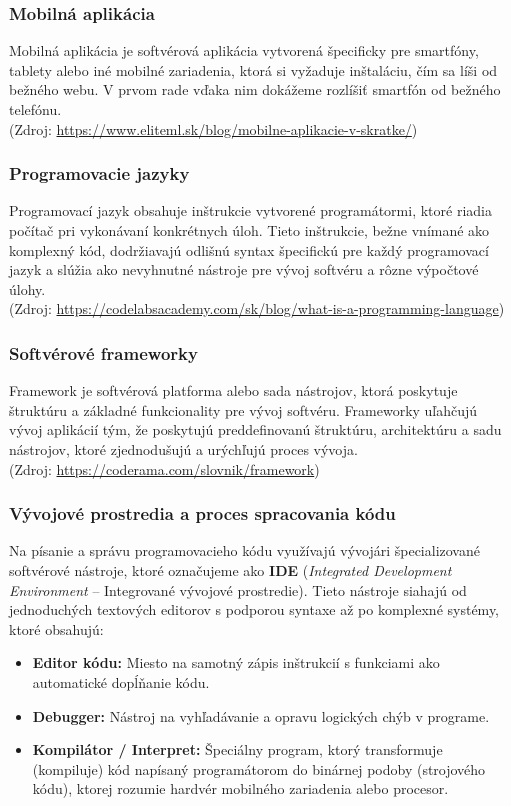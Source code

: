 \subsubsection{Mobilná aplikácia}
Mobilná aplikácia je softvérová aplikácia vytvorená špecificky pre smartfóny, tablety alebo iné mobilné zariadenia, ktorá si vyžaduje inštaláciu, čím sa líši od bežného webu. V prvom rade vďaka nim dokážeme rozlíšiť smartfón od bežného telefónu.
\\ (Zdroj: \url{https://www.eliteml.sk/blog/mobilne-aplikacie-v-skratke/})


\subsubsection{Programovacie jazyky}
Programovací jazyk obsahuje inštrukcie vytvorené programátormi, ktoré riadia počítač pri vykonávaní konkrétnych úloh. Tieto inštrukcie, bežne vnímané ako komplexný kód, dodržiavajú odlišnú syntax špecifickú pre každý programovací jazyk a slúžia ako nevyhnutné nástroje pre vývoj softvéru a rôzne výpočtové úlohy.
\\ (Zdroj: \url{https://codelabsacademy.com/sk/blog/what-is-a-programming-language})

\subsubsection{Softvérové frameworky}
Framework je softvérová platforma alebo sada nástrojov, ktorá poskytuje štruktúru a základné funkcionality pre vývoj softvéru. Frameworky uľahčujú vývoj aplikácií tým, že poskytujú preddefinovanú štruktúru, architektúru a sadu nástrojov, ktoré zjednodušujú a urýchľujú proces vývoja.
\\ (Zdroj: \url{https://coderama.com/slovnik/framework})

\subsubsection{Vývojové prostredia a proces spracovania kódu}
Na písanie a správu programovacieho kódu využívajú vývojári špecializované softvérové nástroje, ktoré označujeme ako \textbf{IDE} (\textit{Integrated Development Environment} – Integrované vývojové prostredie). Tieto nástroje siahajú od jednoduchých textových editorov s podporou syntaxe až po komplexné systémy, ktoré obsahujú:

\begin{itemize}
    \item \textbf{Editor kódu:} Miesto na samotný zápis inštrukcií s funkciami ako automatické dopĺňanie kódu.
    \item \textbf{Debugger:} Nástroj na vyhľadávanie a opravu logických chýb v programe.
    \item \textbf{Kompilátor / Interpret:} Špeciálny program, ktorý transformuje (kompiluje) kód napísaný programátorom do binárnej podoby (strojového kódu), ktorej rozumie hardvér mobilného zariadenia alebo procesor.
\end{itemize}

